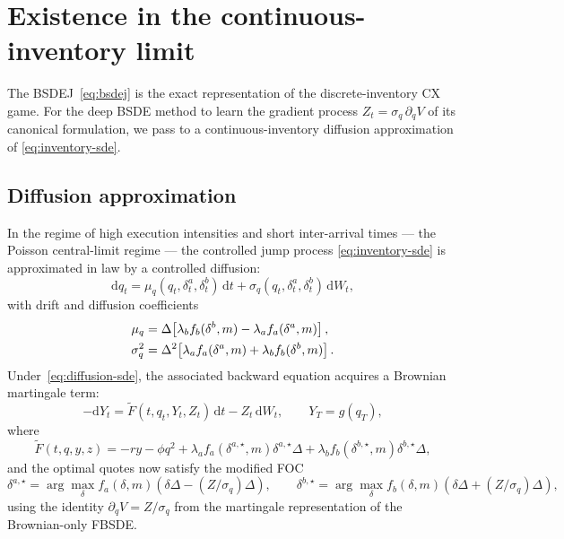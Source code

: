 \documentclass[11pt,a4paper]{article}
\theoremstyle{definition}
\theoremstyle{remark}
\newcommand{\dd}{\mathrm{d}}
\begin{document}
\section{Existence in the continuous-inventory limit}
\label{sec:feng-existence}

The BSDEJ~\eqref{eq:bsdej} is the exact representation of the
discrete-inventory CX game.  For the deep BSDE method to learn
the gradient process $Z_t = \sigma_q \, \partial_q V$ of its
canonical formulation, we pass to a continuous-inventory
diffusion approximation of \eqref{eq:inventory-sde}.

\subsection{Diffusion approximation}

In the regime of high execution intensities and short inter-arrival
times --- the Poisson central-limit regime --- the controlled jump
process \eqref{eq:inventory-sde} is approximated in law by a
controlled diffusion:
\begin{equation}\label{eq:diffusion-sde}
\dd q_t = \mu_q(q_t, \delta^a_t, \delta^b_t) \, \dd t
+ \sigma_q(q_t, \delta^a_t, \delta^b_t) \, \dd W_t,
\end{equation}
with drift and diffusion coefficients
\begin{align}\label{eq:mu-sigma}
\mu_q &= \Delta \!\left[ \lambda_b f_b(\delta^b, m) - \lambda_a f_a(\delta^a, m) \right], \notag\\
\sigma_q^2 &= \Delta^2 \!\left[ \lambda_a f_a(\delta^a, m) + \lambda_b f_b(\delta^b, m) \right].
\end{align}
Under~\eqref{eq:diffusion-sde}, the associated backward equation
acquires a Brownian martingale term:
\begin{equation}\label{eq:bsde-diffusion}
-\dd Y_t = \widetilde{F}(t, q_t, Y_t, Z_t) \, \dd t - Z_t \, \dd W_t,
\qquad Y_T = g(q_T),
\end{equation}
where
\begin{equation}\label{eq:F-tilde}
\widetilde{F}(t, q, y, z) = -r y - \phi q^2
+ \lambda_a f_a(\delta^{a,\star}, m) \delta^{a,\star} \Delta
+ \lambda_b f_b(\delta^{b,\star}, m) \delta^{b,\star} \Delta,
\end{equation}
and the optimal quotes now satisfy the modified FOC
\begin{equation}\label{eq:foc-diffusion}
\delta^{a,\star} = \arg\max_\delta f_a(\delta, m)(\delta \Delta - (Z/\sigma_q) \Delta),
\qquad
\delta^{b,\star} = \arg\max_\delta f_b(\delta, m)(\delta \Delta + (Z/\sigma_q) \Delta),
\end{equation}
using the identity $\partial_q V = Z/\sigma_q$ from the martingale
representation of the Brownian-only FBSDE.
\end{document}
